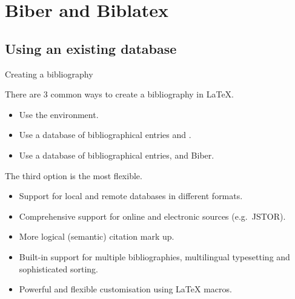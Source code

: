 \overleaf

\section{Biber and Biblatex}

\subsection{Using an existing database}\label{subsec:use-bib}

\begin{frame}{Creating a bibliography}

  There are 3 common ways to create a bibliography in \LaTeX{}.
  \begin{itemize}
    \item Use the  environment.
    \item Use a database of bibliographical entries and \BibTeX{}.
    \item Use a database of bibliographical entries,  and Biber.
  \end{itemize}

  The third option is the most flexible.
  \begin{itemize}
    \item Support for local and remote databases in different formats.
    \item Comprehensive support for online and electronic sources (e.g.~JSTOR).
    \item More logical (semantic) citation mark up.
    \item Built-in support for multiple bibliographies, multilingual typesetting and sophisticated sorting.
    \item Powerful and flexible customisation using \LaTeX{} macros.
  \end{itemize}

\end{frame}

